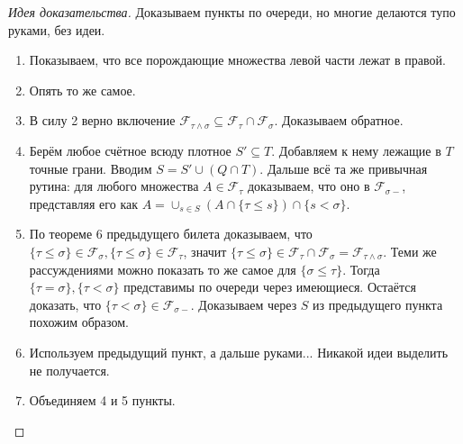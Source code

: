 \documentclass[16pt]{article}
\theoremstyle{definition}
\begin{document}
\begin{proof}[Идея доказательства] Доказываем пункты по очереди, но многие делаются тупо руками, без идеи.
\begin{enumerate}
    \item Показываем, что все порождающие множества левой части лежат в правой.
    \item Опять то же самое.
    \item В силу 2 верно включение $\mathcal{F}_{\tau \wedge \sigma} \subseteq \mathcal{F}_\tau \cap \mathcal{F}_\sigma$. Доказываем обратное.
    \item Берём любое счётное всюду плотное $S' \subseteq T$. Добавляем к нему лежащие в $T$ точные грани. Вводим $S = S' \cup (Q \cap T)$. Дальше всё та же привычная рутина: для любого множества $A \in \mathcal{F}_\tau$ доказываем, что оно в $\mathcal{F}_{\sigma-}$, представляя его как $A = \cup_{s \in S}(A \cap \{\tau \le s\}) \cap \{s < \sigma\}$.
    \item По теореме 6 предыдущего билета доказываем, что $\{\tau \le \sigma\} \in \mathcal{F}_\sigma, \{\tau \le \sigma\} \in \mathcal{F}_\tau$, значит $\{\tau \le \sigma\} \in \mathcal{F}_\tau \cap \mathcal{F}_\sigma = \mathcal{F}_{\tau \wedge \sigma}$. Теми же рассуждениями можно показать то же самое для $\{\sigma \le \tau\}$. Тогда $\{\tau = \sigma\}, \{\tau < \sigma\}$ представимы по очереди через имеющиеся. Остаётся доказать, что $\{\tau < \sigma\} \in \mathcal{F}_{\sigma-}$. Доказываем через $S$ из предыдущего пункта похожим образом.
    \item Используем предыдущий пункт, а дальше руками... Никакой идеи выделить не получается.
    \item Объединяем 4 и 5 пункты.
\end{enumerate}
\end{proof}
\end{document}

